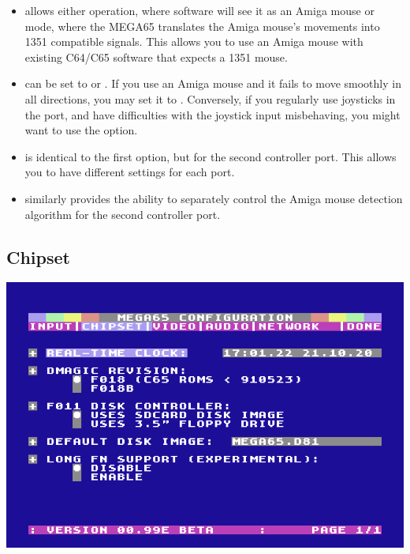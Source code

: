 \begin{itemize}
  \item {} allows either  operation,
  where software will see it as an Amiga mouse or  mode, where the MEGA65 translates the Amiga mouse's movements into 1351 compatible signals. This allows you to use an Amiga mouse with existing C64/C65 software that expects a 1351 mouse.
  \item {} can be set to  or . If you use an Amiga mouse and it fails to move smoothly in all directions, you may set it to . Conversely, if you regularly use joysticks in the port, and have difficulties with the joystick input misbehaving, you might want to use the  option.
  \item {} is identical to the first option, but for the second controller port. This allows you to have different settings for each port.
  \item {} similarly provides the ability to separately control the Amiga mouse detection algorithm for the second controller port.
\end{itemize}


\subsection{Chipset}
\label{configuring-chipset}
\begin{center}
\includegraphics[width=0.7\linewidth]{images/ss-m65config-2.png}
\end{center}

